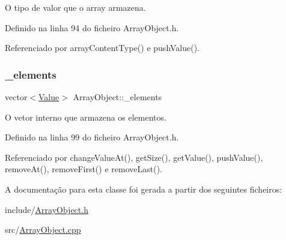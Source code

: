O tipo de valor que o array armazena. 

Definido na linha 94 do ficheiro Array\+Object.\+h.



Referenciado por array\+Content\+Type() e push\+Value().

\mbox{\label{classArrayObject_a1d085d50c90613812fdf539472e76b0c}} 
\subsubsection{\texorpdfstring{\+\_\+elements}{\_elements}}
{\footnotesize\ttfamily vector$<$\hyperlink{structValue}{Value}$>$ Array\+Object\+::\+\_\+elements\hspace{0.3cm}{\ttfamily [private]}}

O vetor interno que armazena os elementos. 

Definido na linha 99 do ficheiro Array\+Object.\+h.



Referenciado por change\+Value\+At(), get\+Size(), get\+Value(), push\+Value(), remove\+At(), remove\+First() e remove\+Last().



A documentação para esta classe foi gerada a partir dos seguintes ficheiros\+:\begin{DoxyCompactItemize}
\item 
include/\hyperlink{ArrayObject_8h}{Array\+Object.\+h}\item 
src/\hyperlink{ArrayObject_8cpp}{Array\+Object.\+cpp}\end{DoxyCompactItemize}
